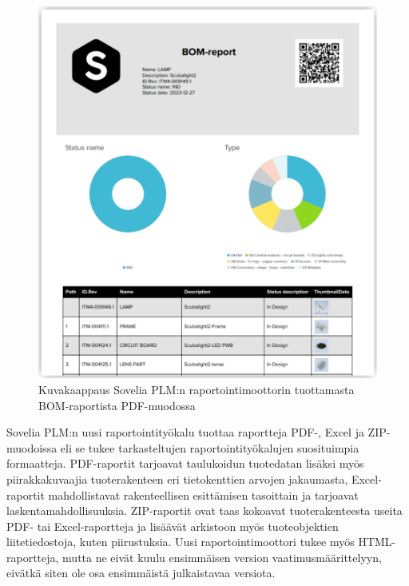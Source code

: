 \begin{figure}[tbh]
\includegraphics[width=1\textwidth]{img/report.png}
\caption{Kuvakaappaus Sovelia PLM:n raportointimoottorin tuottamasta BOM-raportista PDF-muodossa\label{fig:report}}
\end{figure}

Sovelia PLM:n uusi raportointityökalu tuottaa raportteja PDF-, Excel ja ZIP-muodoissa eli se tukee tarkasteltujen raportointityökalujen suosituimpia formaatteja. PDF-raportit tarjoavat taulukoidun tuotedatan lisäksi myös piirakkakuvaajia tuoterakenteen eri tietokenttien arvojen jakaumasta, Excel-raportit mahdollistavat rakenteellisen esittämisen tasoittain ja tarjoavat laskentamahdollisuuksia. ZIP-raportit ovat taas kokoavat tuoterakenteesta useita PDF- tai Excel-raportteja ja lisäävät arkistoon myös tuoteobjektien liitetiedostoja, kuten piirustuksia. Uusi raportointimoottori tukee myös HTML-raportteja, mutta ne eivät kuulu ensimmäisen version vaatimusmäärittelyyn, eivätkä siten ole osa ensimmäistä julkaistavaa versiota.


